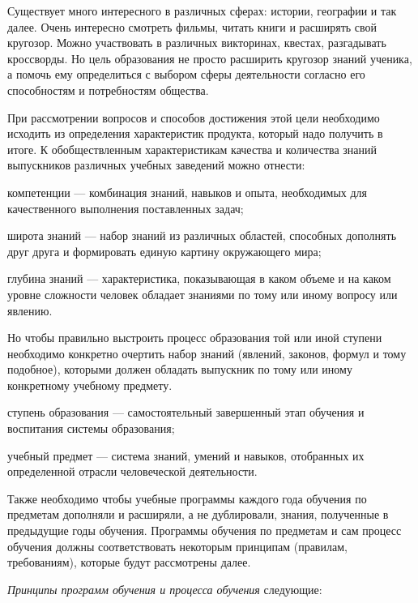Существует много интересного в различных сферах: истории, географии и так далее.  Очень интересно смотреть фильмы, читать книги и расширять свой кругозор. Можно участвовать в различных викторинах, квестах, разгадывать кроссворды. Но цель образования не просто расширить кругозор знаний ученика, а помочь ему определиться с выбором сферы деятельности согласно его способностям и потребностям общества.

При рассмотрении вопросов и способов достижения этой цели необходимо исходить из определения характеристик продукта, который надо получить в итоге. К обобществленным характеристикам качества и количества знаний выпускников различных учебных заведений можно отнести:
\begin{textitemize}
	\item компетенции --- комбинация знаний, навыков и опыта, необходимых для качественного выполнения поставленных задач;
	\item широта знаний --- набор знаний из различных областей, способных дополнять друг друга и формировать единую картину окружающего мира;
	\item глубина знаний --- характеристика, показывающая в каком объеме и на каком уровне сложности человек обладает знаниями по тому или иному вопросу или явлению.
\end{textitemize}

Но чтобы правильно выстроить процесс образования той или иной ступени необходимо конкретно очертить набор знаний (явлений, законов, формул и тому подобное), которыми должен обладать выпускник по тому или иному конкретному учебному предмету.
\begin{textitemize}
	\item ступень образования --- самостоятельный завершенный этап обучения и воспитания системы образования;
	\item учебный предмет --- система знаний, умений и навыков, отобранных их определенной отрасли человеческой деятельности.
\end{textitemize}

Также необходимо чтобы учебные программы каждого года обучения по предметам дополняли и расширяли, а не дублировали, знания, полученные в предыдущие годы обучения. Программы обучения по предметам и сам процесс обучения должны соответствовать некоторым принципам (правилам, требованиям), которые будут рассмотрены далее.  

\textit{Принципы программ обучения и процесса обучения} следующие:


